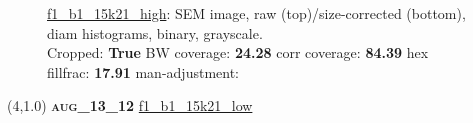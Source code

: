 \begin{figure}[h!]
\label{semimg2}
\caption*{\hyperlink{covtableaug_13_12}{\color{blue} \small \ttfamily f1\_b1\_15k21\_high}: SEM image, raw (top)/size-corrected (bottom), diam histograms, binary, grayscale.\\Cropped: {\bf True} \;\; BW coverage: {\bf 24.28} \:\: corr coverage: {\bf 84.39} \:\: hex fillfrac: {\bf 17.91} \:\: man-adjustment: {\bf \color{blue}{Yes}}}
\end{figure}
\newpage

\begin{textblock}{5}(4,1.0)
{\bf \textsc{aug\_13\_12}}
\hspace{4.5cm}
\hyperlink{covtableaug_13_12}{\color{blue} \large \ttfamily f1\_b1\_15k21\_low}
\end{textblock}


